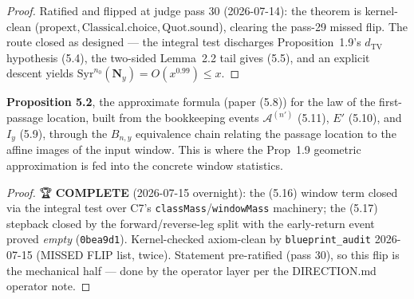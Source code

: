 \begin{proof}
  \leanok
  Ratified and flipped at judge pass 30 (2026-07-14): the theorem is kernel-clean
  (\(\mathrm{propext}, \mathrm{Classical.choice}, \mathrm{Quot.sound}\)), clearing the pass-29
  missed flip.  The route closed as designed --- the integral test discharges Proposition~1.9's
  \(d_{\mathrm{TV}}\) hypothesis (5.4), the two-sided Lemma~2.2 tail gives (5.5), and an explicit
  descent yields \(\mathrm{Syr}^{n_0}(\mathbf N_y) = O(x^{0.99}) \le x\).
\end{proof}

\begin{proposition}\label{C8}
  \leanok
\textbf{Proposition 5.2}, the approximate formula (paper (5.8)) for the law of the
first-passage location, built from the bookkeeping events
\(\mathcal{A}^{(n')}\) (5.11), \(E'\) (5.10), and \(I_y\) (5.9), through the
\(B_{n,y}\) equivalence chain relating the passage location to the affine images of the input
window.  This is where the Prop~1.9 geometric approximation is fed into the concrete window
statistics.
\end{proposition}
\begin{proof}
  \leanok
  🏆 \textbf{COMPLETE} (2026-07-15 overnight): the (5.16) window term closed via the integral
  test over C7's \texttt{classMass}/\texttt{windowMass} machinery; the (5.17) stepback closed
  by the forward/reverse-leg split with the early-return event proved \emph{empty}
  (\texttt{0bea9d1}).  Kernel-checked axiom-clean by \texttt{blueprint\_audit} 2026-07-15
  (MISSED FLIP list, twice).  Statement pre-ratified (pass 30), so this flip is the mechanical
  half — done by the operator layer per the DIRECTION.md operator note.
\end{proof}


